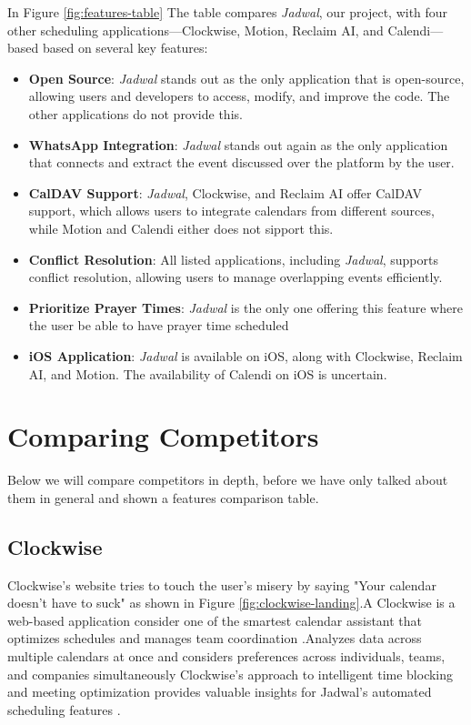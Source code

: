 \documentclass[12pt,a4paper]{report}
\begin{document}
In Figure \ref{fig:features-table} The table compares \textit{Jadwal}, our project, with four other scheduling applications—Clockwise, Motion, Reclaim AI, and Calendi—based based on several key features:
\begin{itemize}
    \item \textbf{Open Source}: \textit{Jadwal} stands out as the only application that is open-source, allowing users and developers to access, modify, and improve the code. The other applications do not provide this.
    \item \textbf{WhatsApp Integration}: \textit{Jadwal} stands out again as the only application that connects and extract the event discussed over the platform by the user.
    \item \textbf{CalDAV Support}: \textit{Jadwal}, Clockwise, and Reclaim AI offer CalDAV support, which allows users to integrate calendars from different sources, while Motion and Calendi either does not sipport this.
    \item \textbf{Conflict Resolution}: All listed applications, including \textit{Jadwal}, supports conflict resolution, allowing users to manage overlapping events efficiently.
    \item \textbf{Prioritize Prayer Times}: \textit{Jadwal} is the only one offering this feature where the user be able to have prayer time scheduled
    \item \textbf{iOS Application}: \textit{Jadwal} is available on iOS, along with Clockwise, Reclaim AI, and Motion. The availability of Calendi on iOS is uncertain.
\end{itemize}

\section{Comparing Competitors}

Below we will compare competitors in depth, before we have only talked about them in general and shown a features comparison table.

\subsection{Clockwise}

Clockwise's website tries to touch the user's misery by saying "Your calendar doesn't have to suck" as shown in Figure \ref{fig:clockwise-landing}.A Clockwise is a web-based application consider one of the smartest calendar assistant that optimizes schedules and manages team coordination \cite{clockwise}.Analyzes data across multiple calendars at once and considers preferences across individuals, teams, and companies simultaneously Clockwise's approach to intelligent time blocking and meeting optimization provides valuable insights for Jadwal's automated scheduling features \cite{clockwise}.
\end{document}
